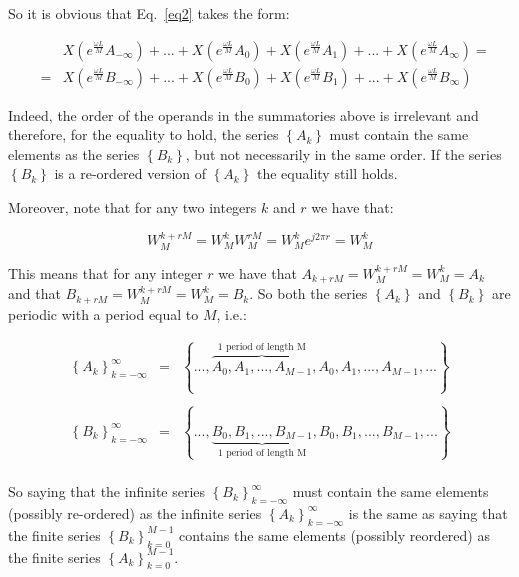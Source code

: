\documentclass[a4paper,11pt,oneside]{article}
\begin{document}
So it is obvious that Eq.~\ref{eq2} takes the form:

\[
\begin{array}{lll}
&&X\left(e^{\frac{\omega L}{M}}A_{-\infty} \right)+...+X\left(e^{\frac{\omega L}{M}}A_{0} \right)+X\left(e^{\frac{\omega L}{M}}A_{1} \right)+...+X\left(e^{\frac{\omega L}{M}}A_{\infty}\right)=\\
&=&X\left(e^{\frac{\omega L}{M}}B_{-\infty} \right)+...+X\left(e^{\frac{\omega L}{M}}B_{0} \right)+X\left(e^{\frac{\omega L}{M}}B_{1} \right)+...+X\left(e^{\frac{\omega L}{M}}B_{\infty}\right)
\end{array}
\]

Indeed, the order of the operands in the summatories above is irrelevant and therefore, for the equality to hold, the series $\left\{A_{k}\right\}$ must contain the same elements as the series $\left\{B_{k}\right\}$, but not necessarily in the same order. If the series $\left\{B_{k}\right\}$ is a re-ordered version of $\left\{A_{k}\right\}$ the equality still holds.

Moreover, note that for any two integers $k$ and $r$ we have that:

 \[
 W_{M}^{k+r M}=W_{M}^{k}W_{M}^{r M}=W_{M}^{k}e^{j2\pi r}=W_{M}^{k}
 \]

This means that for any integer $r$ we have that $A_{k+rM}=W_{M}^{k+rM}=W_{M}^{k}=A_{k}$ and that $B_{k+rM}=W_{M}^{k+rM}=W_{M}^{k}=B_{k}$. So both the series $\left\{A_{k}\right\}$ and $\left\{B_{k}\right\}$ are periodic with a period equal to $M$, i.e.:

\[
\begin{array}{lll}
\left\{A_{k}\right\}_{k=-\infty}^{\infty} &=& \left\{...,\overbrace{A_0,A_1,...,A_{M-1}}^{\textrm{1 period of length M}},A_0,A_1,...,A_{M-1},...\right\}\\
&&\\
\left\{B_{k}\right\}_{k=-\infty}^{\infty} &=& \left\{...,\underbrace{B_0,B_1,...,B_{M-1}}_{\textrm{1 period of length M}},B_0,B_1,...,B_{M-1},...\right\}\\
\end{array}
\]

So saying that the infinite series $\left\{B_{k}\right\}_{k=-\infty}^{\infty}$ must contain the same elements (possibly re-ordered) as the infinite series $\left\{A_{k}\right\}_{k=-\infty}^{\infty}$ is the same as saying that the finite series $\left\{B_{k}\right\}_{k=0}^{M-1}$ contains the same elements (possibly reordered) as the finite series $\left\{A_{k}\right\}_{k=0}^{M-1}$.
\end{document}
